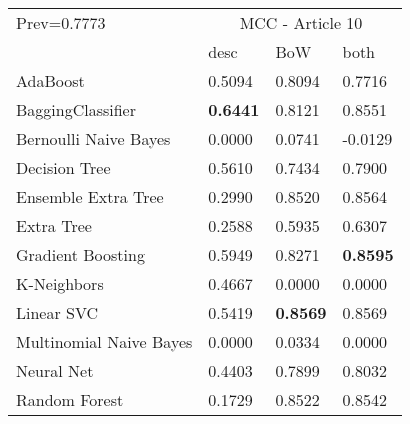 \begin{tabular}{|l|l|l|l| }
\hline
Prev=0.7773 &  \multicolumn{3}{c|}{MCC - Article 10} \\
\cline{2-4} & desc & BoW & both \\ \hline
AdaBoost                & 0.5094 & 0.8094 & 0.7716\\
BaggingClassifier       & {\bf 0.6441} & 0.8121 & 0.8551\\
Bernoulli Naive Bayes   & 0.0000 & 0.0741 & -0.0129\\
Decision Tree           & 0.5610 & 0.7434 & 0.7900\\
Ensemble Extra Tree     & 0.2990 & 0.8520 & 0.8564\\
Extra Tree              & 0.2588 & 0.5935 & 0.6307\\
Gradient Boosting       & 0.5949 & 0.8271 & {\bf 0.8595}\\
K-Neighbors             & 0.4667 & 0.0000 & 0.0000\\
Linear SVC              & 0.5419 & {\bf 0.8569} & 0.8569\\
Multinomial Naive Bayes & 0.0000 & 0.0334 & 0.0000\\
Neural Net              & 0.4403 & 0.7899 & 0.8032\\
Random Forest           & 0.1729 & 0.8522 & 0.8542\\
\hline
\end{tabular}